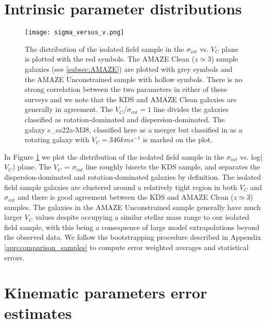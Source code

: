 \documentclass[fleqn,usenatbib]{mnras}
\begin{document}
\section{Intrinsic parameter distributions}

\begin{figure}
\centering \hspace{-1.13cm}
\texttt{[image: sigma\_versus\_v.png]}
\caption{The distribution of the isolated field sample in the $\sigma_{int}$ vs. $V_{C}$ plane is plotted with the red symbols.
The AMAZE Clean ($z\simeq3$) sample galaxies (see \protect\cref{subsec:AMAZE}) are plotted with grey symbols and the AMAZE Unconstrained sample with hollow symbols.    There is no strong correlation between the two parameters in either of these surveys and we note that the KDS and AMAZE Clean galaxies are generally in agreement.
The $V_{C}/\sigma_{int} = 1$ line divides the galaxies classified as rotation-dominated and dispersion-dominated.
The galaxy s\_sa22a-M38, classified here as a merger but classified in \protect\cite{Gnerucci2011} as a rotating galaxy with $V_{C} = 346 kms^{-1}$ is marked on the plot.}
\label{fig:intrinsic_parameters}
\end{figure}

In Figure \ref{fig:intrinsic_parameters} we plot the distribution of the isolated field sample in the $\sigma_{int}$ vs. log($V_{C}$) plane. 
The $V_{C}$ = $\sigma_{int}$ line roughly bisects the KDS sample, and separates the dispersion-dominated and rotation-dominated galaxies by definition.
The isolated field sample galaxies are clustered around a relatively tight region in both $V_{C}$ and $\sigma_{int}$ and there is good agreement between the KDS and AMAZE Clean ($z\simeq3$) samples.
The galaxies in the AMAZE Unconstrained sample generally have much larger $V_{C}$ values despite occupying a similar stellar mass range to our isolated field sample, with this being a consequence of large model extrapolations beyond the observed data.
We follow the bootstrapping procedure described in Appendix \ref{app:comparison_samples} to compute error weighted averages and statistical errors.

\section{Kinematic parameters error estimates}\label{app:kin_error_estimates}
\end{document}
